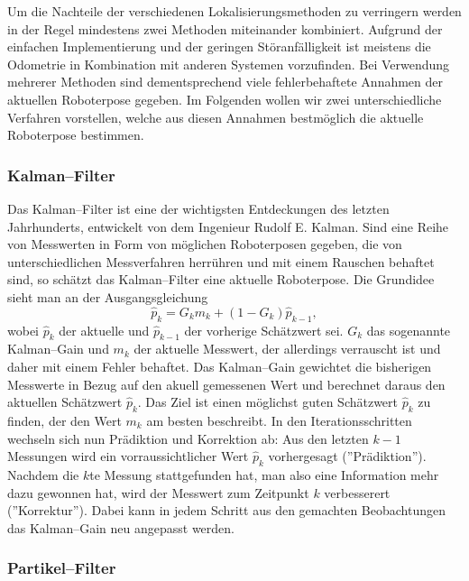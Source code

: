 Um die Nachteile der verschiedenen Lokalisierungsmethoden zu
 verringern werden in der Regel mindestens zwei Methoden miteinander
 kombiniert. Aufgrund der einfachen Implementierung und der geringen
 Störanfälligkeit ist meistens die Odometrie in Kombination mit
 anderen Systemen vorzufinden. Bei Verwendung mehrerer Methoden sind
 dementsprechend viele fehlerbehaftete Annahmen der aktuellen
 Roboterpose gegeben. Im Folgenden wollen wir zwei unterschiedliche
 Verfahren vorstellen, welche aus diesen Annahmen bestmöglich die
 aktuelle Roboterpose bestimmen.
 
\subsubsection{Kalman--Filter}

Das Kalman--Filter ist eine der wichtigsten Entdeckungen des letzten Jahrhunderts, entwickelt von dem Ingenieur Rudolf E. Kalman.
Sind eine Reihe von Messwerten in Form von möglichen Roboterposen gegeben, die von unterschiedlichen Messverfahren herrühren und mit einem Rauschen behaftet sind, so schätzt das Kalman--Filter eine aktuelle Roboterpose.
Die Grundidee sieht man an der Ausgangsgleichung \[ \hat{p}_k = G_k m_k + (1-G_k) \hat{p}_{k-1}, \] wobei \(\hat{p}_k\) der aktuelle und  \(\hat{p}_{k-1}\) der vorherige Schätzwert sei. \(G_k\) das sogenannte Kalman--Gain und \(m_k\) der aktuelle Messwert, der allerdings verrauscht ist und daher mit einem Fehler behaftet. Das Kalman--Gain gewichtet die bisherigen Messwerte in Bezug auf den akuell gemessenen Wert und berechnet daraus den aktuellen Schätzwert \(\hat{p}_k\). Das Ziel ist einen möglichst guten Schätzwert \(\hat{p}_k\) zu finden, der den Wert \(m_k\) am besten beschreibt.
In den Iterationsschritten wechseln sich nun Prädiktion und Korrektion ab: Aus den letzten \(k-1\) Messungen wird ein vorraussichtlicher Wert \(\hat{p}_k\) vorhergesagt (''Prädiktion''). Nachdem die \(k\)te Messung stattgefunden hat, man also eine Information mehr dazu gewonnen hat, wird der Messwert zum Zeitpunkt \(k\) verbesserert (''Korrektur''). Dabei kann in jedem Schritt aus den gemachten Beobachtungen das Kalman--Gain neu angepasst werden.

\subsubsection{Partikel--Filter}

